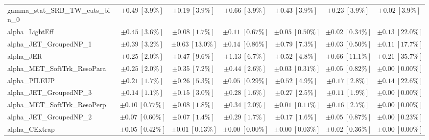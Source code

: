 \begin{sidewaystable}
\begin{center}
\begin{tabular*}{\textwidth}{@{\extracolsep{\fill}}lcccccc}
gamma\_stat\_SRB\_TW\_cuts\_bin\_0         & $\pm 0.49\ [3.9\%] $          & $\pm 0.19\ [3.9\%] $          & $\pm 0.66\ [3.9\%] $          & $\pm 0.43\ [3.9\%] $          & $\pm 0.23\ [3.9\%] $          & $\pm 0.02\ [3.9\%] $       \\
alpha\_LightEff         & $\pm 0.45\ [3.6\%] $          & $\pm 0.08\ [1.7\%] $          & $\pm 0.11\ [0.67\%] $          & $\pm 0.05\ [0.50\%] $          & $\pm 0.02\ [0.34\%] $          & $\pm 0.13\ [22.0\%] $       \\
alpha\_JET\_GroupedNP\_1         & $\pm 0.39\ [3.2\%] $          & $\pm 0.63\ [13.0\%] $          & $\pm 0.14\ [0.86\%] $          & $\pm 0.79\ [7.3\%] $          & $\pm 0.03\ [0.50\%] $          & $\pm 0.11\ [17.7\%] $       \\
alpha\_JER         & $\pm 0.25\ [2.0\%] $          & $\pm 0.47\ [9.6\%] $          & $\pm 1.13\ [6.7\%] $          & $\pm 0.52\ [4.8\%] $          & $\pm 0.66\ [11.1\%] $          & $\pm 0.21\ [35.7\%] $       \\
alpha\_MET\_SoftTrk\_ResoPara         & $\pm 0.25\ [2.0\%] $          & $\pm 0.35\ [7.2\%] $          & $\pm 0.44\ [2.6\%] $          & $\pm 0.03\ [0.31\%] $          & $\pm 0.05\ [0.82\%] $          & $\pm 0.00\ [0.00\%] $       \\
alpha\_PILEUP         & $\pm 0.21\ [1.7\%] $          & $\pm 0.26\ [5.3\%] $          & $\pm 0.05\ [0.29\%] $          & $\pm 0.52\ [4.9\%] $          & $\pm 0.17\ [2.8\%] $          & $\pm 0.14\ [22.6\%] $       \\
alpha\_JET\_GroupedNP\_3         & $\pm 0.14\ [1.1\%] $          & $\pm 0.15\ [3.0\%] $          & $\pm 0.28\ [1.6\%] $          & $\pm 0.27\ [2.5\%] $          & $\pm 0.11\ [1.9\%] $          & $\pm 0.00\ [0.00\%] $       \\
alpha\_MET\_SoftTrk\_ResoPerp         & $\pm 0.10\ [0.77\%] $          & $\pm 0.08\ [1.8\%] $          & $\pm 0.34\ [2.0\%] $          & $\pm 0.01\ [0.11\%] $          & $\pm 0.16\ [2.7\%] $          & $\pm 0.00\ [0.00\%] $       \\
alpha\_JET\_GroupedNP\_2         & $\pm 0.07\ [0.60\%] $          & $\pm 0.07\ [1.4\%] $          & $\pm 0.29\ [1.7\%] $          & $\pm 0.17\ [1.6\%] $          & $\pm 0.05\ [0.87\%] $          & $\pm 0.00\ [0.23\%] $       \\
alpha\_CExtrap         & $\pm 0.05\ [0.42\%] $          & $\pm 0.01\ [0.13\%] $          & $\pm 0.00\ [0.00\%] $          & $\pm 0.00\ [0.03\%] $          & $\pm 0.02\ [0.36\%] $          & $\pm 0.00\ [0.00\%] $       \\

\end{tabular*}
\end{center}
\end{sidewaystable}
